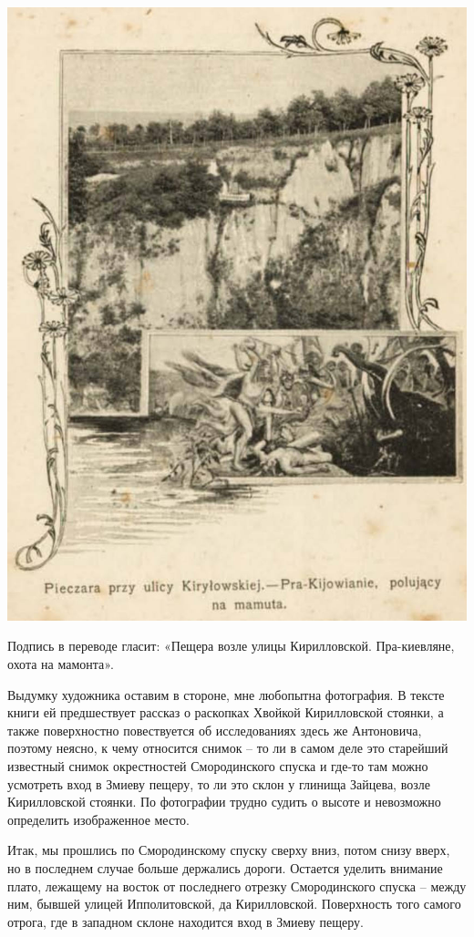 \begin{center}
\includegraphics[width=\linewidth]{chast-zmiy/karta-opis/polska.jpg}
\end{center}

Подпись в переводе гласит: «Пещера возле улицы Кирилловской. Пра-киевляне, охота на мамонта».

Выдумку художника оставим в стороне, мне любопытна фотография. В тексте книги ей предшествует рассказ о раскопках Хвойкой Кирилловской стоянки, а также поверхностно повествуется об исследованиях здесь же Антоновича, поэтому неясно, к чему относится снимок – то ли в самом деле это старейший известный снимок окрестностей Смородинского спуска и где-то там можно усмотреть вход в Змиеву пещеру, то ли это склон у глинища Зайцева, возле Кирилловской стоянки. По фотографии трудно судить о высоте и невозможно определить изображенное место.

Итак, мы прошлись по Смородинскому спуску сверху вниз, потом снизу вверх, но в последнем случае больше держались дороги. Остается уделить внимание плато, лежащему на восток от последнего отрезку Смородинского спуска – между ним, бывшей улицей Ипполитовской, да Кирилловской. Поверхность того самого отрога, где в западном склоне находится вход в Змиеву пещеру.


